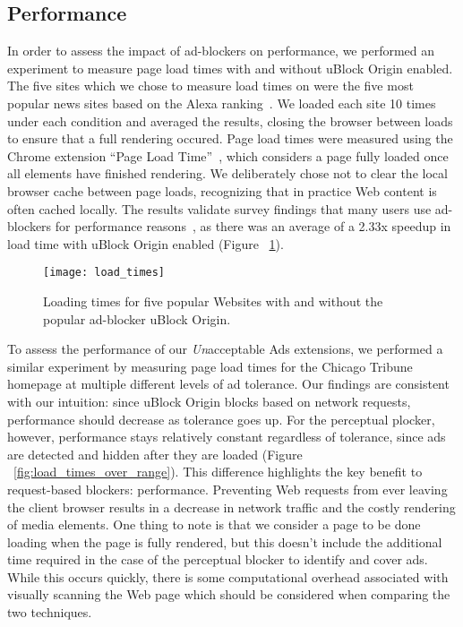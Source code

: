 \subsection{Performance}
In order to assess the impact of ad-blockers on performance, we performed an experiment to measure page load times with and without uBlock Origin enabled.
The five sites which we chose to measure load times on were the five most popular news sites based on the Alexa ranking~\cite{alexa}.
We loaded each site 10 times under each condition and averaged the results, closing the browser between loads to ensure that a full rendering occured.
Page load times were measured using the Chrome extension ``Page Load Time''~\cite{pageloadtime}, which considers a page fully loaded once all elements have finished rendering.
We deliberately chose not to clear the local browser cache between page loads, recognizing that in practice Web content is often cached locally.
The results validate survey findings that many users use ad-blockers for performance reasons~\cite{hubspot2016adblock}, as there was an average of a 2.33x speedup in load time with uBlock Origin enabled (Figure ~\ref{fig:load_times}).

\begin{figure}[t]
\centering
\texttt{[image: load\_times]}
\caption{Loading times for five popular Websites with and without the popular ad-blocker uBlock Origin.}
\label{fig:load_times}
\end{figure}

To assess the performance of our \textit{Un}acceptable Ads extensions, we performed a similar experiment by measuring page load times for the Chicago Tribune homepage at multiple different levels of ad tolerance.
Our findings are consistent with our intuition: since uBlock Origin blocks based on network requests, performance should decrease as tolerance goes up.
For the perceptual plocker, however, performance stays relatively constant regardless of tolerance, since ads are detected and hidden after they are loaded (Figure ~\ref{fig:load_times_over_range}).
This difference highlights the key benefit to request-based blockers: performance.
Preventing Web requests from ever leaving the client browser results in a decrease in network traffic and the costly rendering of media elements.
One thing to note is that we consider a page to be done loading when the page is fully rendered, but this doesn't include the additional time required in the case of the perceptual blocker to identify and cover ads.
While this occurs quickly, there is some computational overhead associated with visually scanning the Web page which should be considered when comparing the two techniques.

